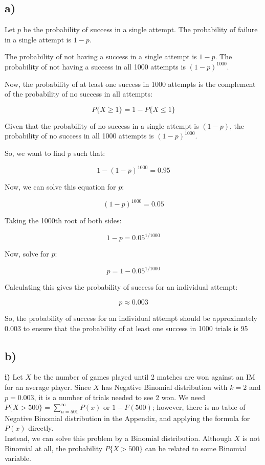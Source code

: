 \documentclass[12pt]{article}
\begin{document}
\subsection*{a)} 

Let $p$ be the probability of success in a single attempt. The probability of failure in a single attempt is $1 - p$.

The probability of not having a success in a single attempt is $1 - p$. The probability of not having a success in all 1000 attempts is $(1 - p)^{1000}$.

Now, the probability of at least one success in 1000 attempts is the complement of the probability of no success in all attempts:

\[
P\{X \geq 1\} = 1 - P\{X \leq 1\}
\]

Given that the probability of no success in a single attempt is $(1 - p)$, the probability of no success in all 1000 attempts is $(1 - p)^{1000}$.

So, we want to find $p$ such that:

\[
1 - (1 - p)^{1000} = 0.95
\]

Now, we can solve this equation for $p$:

\[
(1 - p)^{1000} = 0.05
\]

Taking the 1000th root of both sides:

\[
1 - p = 0.05^{1/1000}
\]

Now, solve for $p$:

\[
p = 1 - 0.05^{1/1000}
\]

Calculating this gives the probability of success for an individual attempt:

\[
p \approx 0.003
\]

So, the probability of success for an individual attempt should be approximately $0.003$ to ensure that the probability of at least one success in 1000 trials is 95%


\subsection*{b)} 
\textbf{i)}
Let \( X \) be the number of games played until 2 matches are won against
an IM for an average player. Since \( X \) has Negative Binomial distribution with \( k = 2\) and \( p = 0.003 \), it is a number of trials needed to see 2 won. We need \( P\{X > 500\} = \sum_{n=501}^{\infty} P(x) \) or \( 1 - F(500) \); however, there is no table of Negative Binomial distribution in the Appendix, and applying the formula for \( P(x) \) directly. \\
Instead, we can solve this problem by a Binomial distribution. Although \( X \) is not Binomial at all, the probability \( P\{X > 500\} \) can be related to some Binomial variable.
\end{document}
